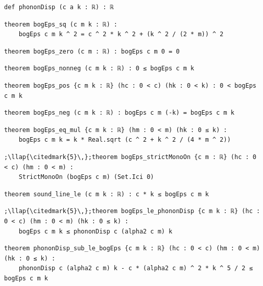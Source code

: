 \begin{lstlisting}[style=leancat]
def phononDisp (c a k : ℝ) : ℝ
\end{lstlisting}

\begin{lstlisting}[style=leancat]
theorem bogEps_sq (c m k : ℝ) :
    bogEps c m k ^ 2 = c ^ 2 * k ^ 2 + (k ^ 2 / (2 * m)) ^ 2
\end{lstlisting}

\begin{lstlisting}[style=leancat]
theorem bogEps_zero (c m : ℝ) : bogEps c m 0 = 0
\end{lstlisting}

\begin{lstlisting}[style=leancat]
theorem bogEps_nonneg (c m k : ℝ) : 0 ≤ bogEps c m k
\end{lstlisting}

\begin{lstlisting}[style=leancat]
theorem bogEps_pos {c m k : ℝ} (hc : 0 < c) (hk : 0 < k) : 0 < bogEps c m k
\end{lstlisting}

\begin{lstlisting}[style=leancat]
theorem bogEps_neg (c m k : ℝ) : bogEps c m (-k) = bogEps c m k
\end{lstlisting}

\begin{lstlisting}[style=leancat]
theorem bogEps_eq_mul {c m k : ℝ} (hm : 0 < m) (hk : 0 ≤ k) :
    bogEps c m k = k * Real.sqrt (c ^ 2 + k ^ 2 / (4 * m ^ 2))
\end{lstlisting}

\begin{lstlisting}[style=leancat]
;\llap{\citedmark{5}\,};theorem bogEps_strictMonoOn {c m : ℝ} (hc : 0 < c) (hm : 0 < m) :
    StrictMonoOn (bogEps c m) (Set.Ici 0)
\end{lstlisting}

\begin{lstlisting}[style=leancat]
theorem sound_line_le (c m k : ℝ) : c * k ≤ bogEps c m k
\end{lstlisting}

\begin{lstlisting}[style=leancat]
;\llap{\citedmark{5}\,};theorem bogEps_le_phononDisp {c m k : ℝ} (hc : 0 < c) (hm : 0 < m) (hk : 0 ≤ k) :
    bogEps c m k ≤ phononDisp c (alpha2 c m) k
\end{lstlisting}

\begin{lstlisting}[style=leancat]
theorem phononDisp_sub_le_bogEps {c m k : ℝ} (hc : 0 < c) (hm : 0 < m) (hk : 0 ≤ k) :
    phononDisp c (alpha2 c m) k - c * (alpha2 c m) ^ 2 * k ^ 5 / 2 ≤ bogEps c m k
\end{lstlisting}

